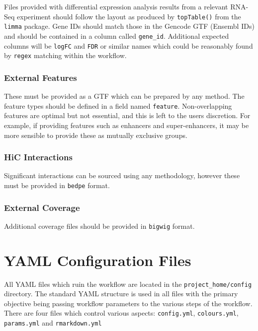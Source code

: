 \documentclass[
]{book}
\begin{document}
Files provided with differential expression analysis results from a relevant RNA-Seq experiment should follow the layout as produced by \texttt{topTable()} from the \texttt{limma} package\citep{limma}.
Gene IDs should match those in the Gencode GTF (Ensembl IDs) and should be contained in a column called \texttt{gene\_id}.
Additional expected columns will be \texttt{logFC} and \texttt{FDR} or similar names which could be reasonably found by \texttt{regex} matching within the workflow.

\hypertarget{external-features}{%
\subsection{External Features}\label{external-features}}

These must be provided as a GTF which can be prepared by any method.
The feature types should be defined in a field named \texttt{feature}.
Non-overlapping features are optimal but not essential, and this is left to the users discretion.
For example, if providing features such as enhancers and super-enhancers\citep{rose}, it may be more sensible to provide these as mutually exclusive groups.

\hypertarget{hic-interactions}{%
\subsection{HiC Interactions}\label{hic-interactions}}

Significant interactions can be sourced using any methodology, however these must be provided in \texttt{bedpe} format.

\hypertarget{external-coverage}{%
\subsection{External Coverage}\label{external-coverage}}

Additional coverage files should be provided in \texttt{bigwig} format.

\hypertarget{editing-yaml}{%
\chapter{YAML Configuration Files}\label{editing-yaml}}

All YAML files which ruin the workflow are located in the \texttt{project\_home/config} directory.
The standard YAML structure is used in all files with the primary objective being passing workflow parameters to the various steps of the workflow.
There are four files which control various aspects: \texttt{config.yml}, \texttt{colours.yml}, \texttt{params.yml} and \texttt{rmarkdown.yml}
\end{document}
